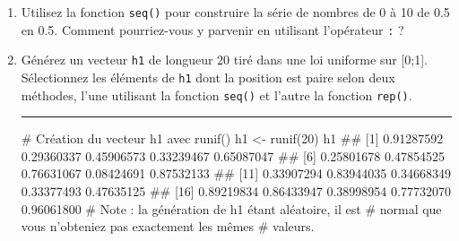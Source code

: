 \documentclass[12pt,twosided, notitlepage]{book}
\newenvironment{Shaded}{}{}
\newcommand{\CommentTok}[1]{\textcolor[rgb]{0.00,0.50,0.00}{#1}}
\newcommand{\DataTypeTok}[1]{#1}
\newcommand{\DecValTok}[1]{#1}
\newcommand{\FloatTok}[1]{#1}
\newcommand{\KeywordTok}[1]{\textcolor[rgb]{0.00,0.00,1.00}{#1}}
\newcommand{\NormalTok}[1]{#1}
\newcommand{\OperatorTok}[1]{#1}
\newcommand{\StringTok}[1]{\textcolor[rgb]{0.00,0.50,0.50}{#1}}
\newif \ifsol
\renewenvironment{Shaded}{\begin{snugshade}}{\end{snugshade}}
\begin{document}

\begin{enumerate}
\def\labelenumi{\alph{enumi}.}
\item
  Utilisez la fonction \texttt{seq()} pour
  construire la série de nombres de 0 à 10 de 0.5 en 0.5. Comment
  pourriez-vous y parvenir en utilisant l'opérateur
  \texttt{:}\index{\texttt{:}} ?

  \ifsol 

  \begin{center} \rule{0.5\linewidth}{\linethickness}\end{center}

\begin{Shaded}
\begin{Highlighting}[]
\CommentTok{# Méthode directe : utilisation de l'argument by = de seq()}
\KeywordTok{seq}\NormalTok{(}\DecValTok{0}\NormalTok{, }\DecValTok{10}\NormalTok{, }\DataTypeTok{by =} \FloatTok{0.5}\NormalTok{)}
\NormalTok{  ##  [1]  0.0  0.5  1.0  1.5  2.0  2.5  3.0  3.5  4.0  4.5  5.0  5.5}
\NormalTok{  ## [13]  6.0  6.5  7.0  7.5  8.0  8.5  9.0  9.5 10.0}

\CommentTok{# Méthode "manuelle" : utilisation de `:` et division}
\NormalTok{(}\DecValTok{0}\OperatorTok{:}\DecValTok{20}\NormalTok{) }\OperatorTok{/}\StringTok{ }\DecValTok{2}
\NormalTok{  ##  [1]  0.0  0.5  1.0  1.5  2.0  2.5  3.0  3.5  4.0  4.5  5.0  5.5}
\NormalTok{  ## [13]  6.0  6.5  7.0  7.5  8.0  8.5  9.0  9.5 10.0}
\end{Highlighting}
\end{Shaded}

  \begin{center} \rule{0.5\linewidth}{\linethickness}\end{center} 
    \bigskip 
    \fi
\item
  Générez un vecteur \texttt{h1} de longueur 20 tiré dans une loi
  uniforme sur {[}0;1{]}. Sélectionnez les
  éléments de \texttt{h1} dont la position est paire selon deux
  méthodes, l'une utilisant la fonction
  \texttt{seq()} et l'autre la fonction
  \texttt{rep()}.

  \ifsol 

  \begin{center} \rule{0.5\linewidth}{\linethickness}\end{center}

\begin{Shaded}
\begin{Highlighting}[]
\CommentTok{# Création du vecteur h1 avec runif()}
\NormalTok{h1 <-}\StringTok{ }\KeywordTok{runif}\NormalTok{(}\DecValTok{20}\NormalTok{)}
\NormalTok{h1}
\NormalTok{  ##  [1] 0.91287592 0.29360337 0.45906573 0.33239467 0.65087047}
\NormalTok{  ##  [6] 0.25801678 0.47854525 0.76631067 0.08424691 0.87532133}
\NormalTok{  ## [11] 0.33907294 0.83944035 0.34668349 0.33377493 0.47635125}
\NormalTok{  ## [16] 0.89219834 0.86433947 0.38998954 0.77732070 0.96061800}
\CommentTok{# Note : la génération de h1 étant aléatoire, il est}
\CommentTok{# normal que vous n'obteniez pas exactement les mêmes}
\CommentTok{# valeurs. }


\end{Highlighting}
\end{Shaded}
\end{enumerate}
\end{document}
